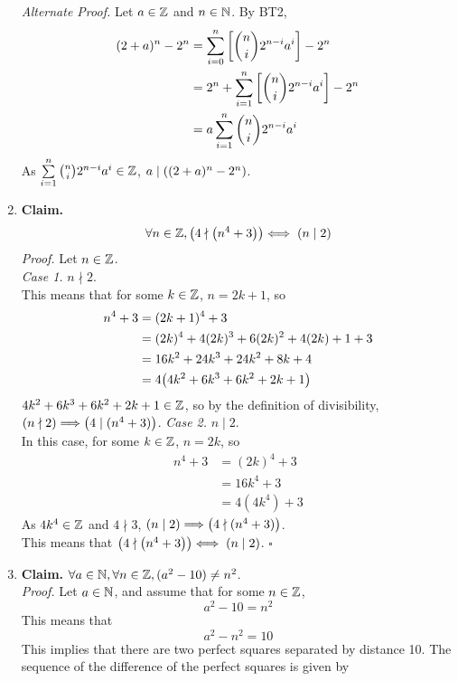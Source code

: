 \documentclass[../MATH135.tex]{subfiles}
\begin{document}
\begin{enumerate}
\begin{tasks}
				\end{tasks}
				\textit{Alternate Proof.}
					Let \(a \in \mathbb{Z}\) and \(n \in \mathbb{N}\). By BT2,
						\begin{align*}
							(2 + a)^n - 2^n &= \sum_{i = 0}^n\qty[\binom{n}{i}2^{n - i}a^i] - 2^n \\
								&= 2^n + \sum_{i = 1}^n\qty[\binom{n}{i}2^{n - i}a^i] - 2^n \\
								&=  a\sum_{i = 1}^n\binom{n}{i}2^{n - i}a^i
						\end{align*}
						As \(\sum\limits_{i = 1}^n\binom{n}{i}2^{n - i}a^i \in \mathbb{Z}\), \(a \mid \qty((2 + a)^n - 2^n)\).
			\item
				\textbf{Claim.} \[\forall n \in \mathbb{Z}, \bigl(4 \nmid \qty(n^4 + 3)\bigl) \iff (n \mid 2)\]
				\textit{Proof.}
					Let \(n \in \mathbb{Z}\). \\
				\textit{Case 1.} \(n \nmid 2\). \\
					This means that for some \(k \in \mathbb{Z}\), \(n = 2k + 1\), so
						\begin{align*}
							n^4 + 3 &= (2k + 1)^4 + 3 \\
								&= (2k)^4 + 4(2k)^3 + 6(2k)^2 + 4(2k) + 1 + 3 \\
								&= 16k^2 + 24k^3 + 24k^2 + 8k + 4 \\
								&= 4\qty(4k^2 + 6k^3 + 6k^2 + 2k + 1)
						\end{align*}
						\(4k^2 + 6k^3 + 6k^2 + 2k + 1 \in \mathbb{Z}\), so by the definition of divisibility, \((n \nmid 2) \Longrightarrow \bigl(4 \mid (n^4 + 3)\bigr)\).
				\textit{Case 2.} \(n \mid 2\). \\
					In this case, for some \(k \in \mathbb{Z}\), \(n = 2k\), so
						\begin{align*}
							n^4 + 3 &= (2k)^4 + 3 \\
								&= 16k^4 + 3 \\
								&= 4(4k^4) + 3
						\end{align*}
					As \(4k^4 \in \mathbb{Z}\) and \(4 \nmid 3\), \((n \mid 2) \Longrightarrow \bigl(4 \nmid (n^4 + 3)\bigr)\). \\
					This means that \(\bigl(4 \nmid \qty(n^4 + 3)\bigl) \iff (n \mid 2)\). \(\square\)
			\item
				\textbf{Claim.} \(\forall a \in \mathbb{N}, \forall n \in \mathbb{Z}, (a^2 - 10) \ne n^2\). \\
				\textit{Proof.}
					Let \(a \in \mathbb{N}\), and assume that for some \(n \in \mathbb{Z}\), 
						\[a^2 - 10 = n^2\]
						This means that
						\[a^2 - n^2 = 10\]
						This implies that there are two perfect squares separated by distance 10. The sequence of the difference of the perfect squares is given by

\end{enumerate}
\end{document}
